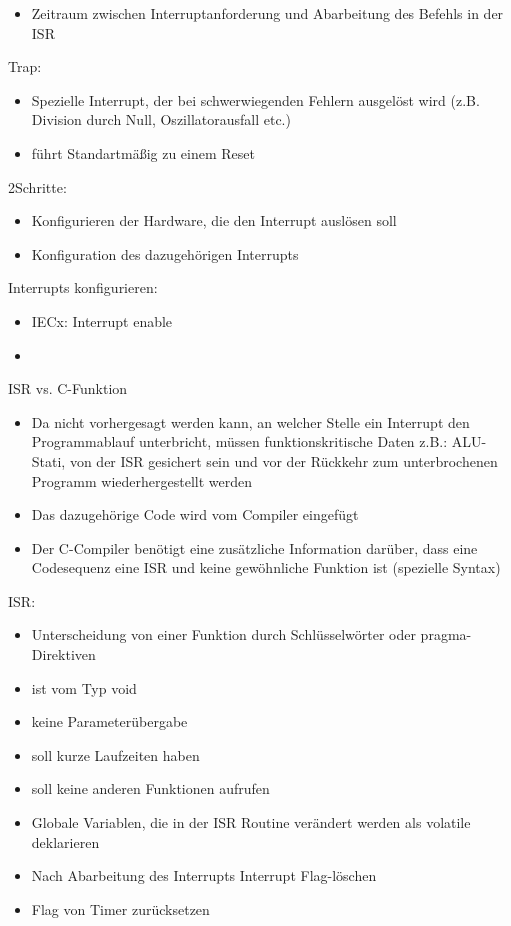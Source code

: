 \begin{itemize}
	\item Zeitraum zwischen Interruptanforderung und Abarbeitung des Befehls in der ISR
\end{itemize}
%
Trap:
\begin{itemize}
	\item Spezielle Interrupt, der bei schwerwiegenden Fehlern ausgelöst wird (z.B. Division durch Null, Oszillatorausfall etc.)
	\item führt Standartmäßig zu einem Reset
\end{itemize}
%
2Schritte:
\begin{itemize}
	\item Konfigurieren der Hardware, die den Interrupt auslösen soll
	\item Konfiguration des dazugehörigen Interrupts
\end{itemize}
%
Interrupts konfigurieren:
\begin{itemize}
	\item IECx: Interrupt enable
	\item 	
\end{itemize}
%
ISR vs. C-Funktion
\begin{itemize}
	\item Da nicht vorhergesagt werden kann, an welcher Stelle ein Interrupt den Programmablauf unterbricht, müssen funktionskritische Daten z.B.: ALU-Stati, von der ISR gesichert sein und vor der Rückkehr zum unterbrochenen Programm wiederhergestellt werden
	\item Das dazugehörige Code wird vom Compiler eingefügt
	\item Der C-Compiler benötigt eine zusätzliche Information darüber, dass eine Codesequenz eine ISR und keine gewöhnliche Funktion ist (spezielle Syntax)	
\end{itemize}

%
ISR:
\begin{itemize}
	\item Unterscheidung von einer Funktion durch Schlüsselwörter oder pragma-Direktiven
	\item ist vom Typ void
	\item keine Parameterübergabe
	\item soll kurze Laufzeiten haben
	\item soll keine anderen Funktionen aufrufen
	\item Globale Variablen, die in der ISR Routine verändert werden als volatile deklarieren
	\item Nach Abarbeitung des Interrupts Interrupt Flag-löschen
	\item Flag von Timer zurücksetzen
\end{itemize}

